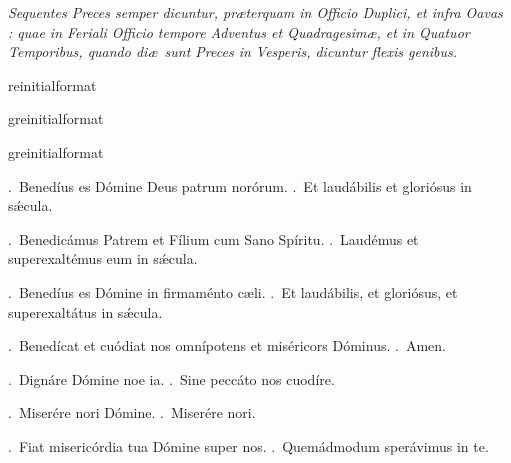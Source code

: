 \documentclass[12pt]{article} %
\newcommand{\myaboveinitial}[1]{%
    \expandafter\renewcommand\csname greinitialformat\endcsname[1]{%
        \fontsize{43}{43}\selectfont ##1
    }
    \gresetfirstlineaboveinitial{\textcolor{benred8}{\raisebox{6.0mm}{\small \textsc{\textbf{#1}}}}}{}
}
\newenvironment{rubric}{\vspace{1 mm}\color{benred8} \itshape \leftskip 0in \setlength{\parindent}{0.25in}}{\vspace{1 mm}}
\newenvironment{response}{\leftskip 0in \setlength{\parindent}{0in}}{\vspace{1 mm}}
\let\oldVbar\Vbar
\renewcommand{\Vbar}{\textcolor{benred8}{\oldVbar .}}
\let\oldRbar\Rbar
\renewcommand{\Rbar}{\textcolor{benred8}{\oldRbar .}}
\begin{document}
\begin{pages}
\begin{Leftside}
\begin{rubric}
Sequentes Preces semper dicuntur, pr\ae terquam in Officio Duplici, et infra Oavas : quae in Feriali Officio tempore Adventus et Quadragesim\ae, et in Quatuor Temporibus, quando di\ae\ sunt Preces in Vesperis, dicuntur flexis genibus.

\end{rubric}

\pend\pstart


\myaboveinitial{\Vbar}

\pend\pstart


\myaboveinitial{\Vbar}

\pend\pstart


\myaboveinitial{\Vbar}

\pend\pstart

\begin{response}
\Vbar\ Bened\'{i}us es D\'{o}mine Deus patrum nor\'{o}rum.
\Rbar\ Et laud\'{a}bilis et glori\'{o}sus in s\'{\ae}cula.

\Vbar\ Benedic\'{a}mus Patrem et F\'{i}lium cum Sano Sp\'{i}ritu.
\Rbar\ Laud\'{e}mus et superexalt\'{e}mus eum in s\'{\ae}cula.

\Vbar\ Bened\'{i}us es D\'{o}mine in firmam\'{e}nto c\ae li.
\Rbar\ Et laud\'{a}bilis, et glori\'{o}sus, et superexalt\'{a}tus in s\'{\ae}cula.

\Vbar\ Bened\'{i}cat et cu\'{o}diat nos omn\'{i}potens et mis\'{e}ricors D\'{o}minus.
\Rbar\ Amen.

\Vbar\ Dign\'{a}re D\'{o}mine noe ia.
\Rbar\ Sine pecc\'{a}to nos cuod\'{i}re.

\Vbar\ Miser\'{e}re nori D\'{o}mine.
\Rbar\ Miser\'{e}re nori.

\Vbar\ Fiat miseric\'{o}rdia tua D\'{o}mine super nos. 
\Rbar\ Quem\'{a}dmodum sper\'{a}vimus in te.


\end{response}
\end{Leftside}
\end{pages}
\end{document}
